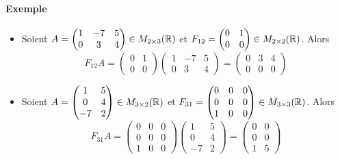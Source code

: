 \paragraph{Exemple}
\begin{itemize}
  \item Soient $A = \begin{pmatrix} 1 & -7 & 5 \\ 0 & 3 & 4 \end{pmatrix} \in M_{2\times 3}(\mathbb{R})$ et $F_{1 2} = \begin{pmatrix} 0 & 1 \\ 0 & 0 \end{pmatrix} \in M_{2 \times 2}(\mathbb{R})$. Alors
    $$F_{1 2} A 
      = \begin{pmatrix} 0 & 1 \\ 0 & 0 \end{pmatrix} \begin{pmatrix} 1 & -7 & 5 \\ 0 & 3 & 4 \end{pmatrix} 
      = \begin{pmatrix} 0 & 3 & 4 \\ 0 & 0 & 0 \end{pmatrix}$$

  \item Soient $A = \begin{pmatrix} 1 & 5 \\ 0 & 4 \\ -7 & 2 \end{pmatrix} \in  M_{3 \times 2}(\mathbb{R})$ et $F_{3 1} = \begin{pmatrix} 0 & 0 & 0 \\ 0 & 0 & 0 \\ 1 & 0 & 0 \end{pmatrix} \in M_{3 \times 3}(\mathbb{R})$. Alors
    $$F_{3 1} A 
      = \begin{pmatrix} 0 & 0 & 0 \\ 0 & 0 & 0 \\ 1 & 0 & 0 \end{pmatrix} \begin{pmatrix} 1 & 5 \\ 0 & 4 \\ -7 & 2 \end{pmatrix} 
      = \begin{pmatrix} 0 & 0 \\ 0 & 0 \\ 1 & 5 \end{pmatrix}$$
      

\end{itemize}
